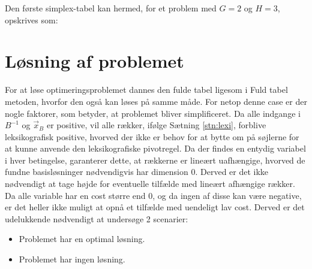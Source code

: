 Den første simplex-tabel kan hermed, for et problem med $G=2$ og $H=3$, opskrives som:\\



\section{Løsning af problemet}
For at løse optimeringsproblemet dannes den fulde tabel ligesom i Fuld tabel metoden, hvorfor den også kan løses på samme måde.
For netop denne case er der nogle faktorer, som betyder, at problemet bliver simplificeret.
Da alle indgange i $B^{-1}$ og $\vec{x}_B$ er positive, vil alle rækker, ifølge Sætning \ref{stn:lexi}, forblive leksikografisk positive, hvorved der ikke er behov for at bytte om på søjlerne for at kunne anvende den leksikografiske pivotregel.
Da der findes en entydig variabel i hver betingelse, garanterer dette, at rækkerne er lineært uafhængige, hvorved de fundne basisløsninger nødvendigvis har dimension $0$. Derved er det ikke nødvendigt at tage højde for eventuelle tilfælde med lineært afhængige rækker. Da alle variable har en cost større end $0$, og da ingen af disse kan være negative, er det heller ikke muligt at opnå et tilfælde med uendeligt lav cost. Derved er det udelukkende nødvendigt at undersøge 2 scenarier: 
\begin{itemize}
\item Problemet har en optimal løsning.
\item Problemet har ingen løsning.
\end{itemize}


